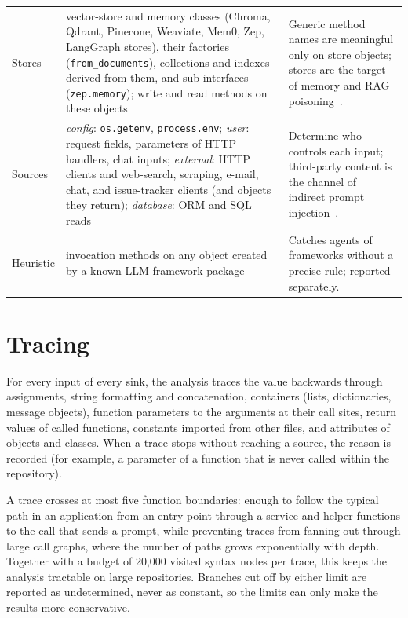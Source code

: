 \begin{table}[t]
\begin{tabular}{@{}>{\raggedright\arraybackslash}p{}>{\raggedright\arraybackslash}p{}>{\raggedright\arraybackslash}p{}@{}}
Stores & vector-store and memory classes (Chroma, Qdrant, Pinecone, Weaviate, Mem0, Zep, LangGraph stores), their factories (\texttt{from\_documents}), collections and indexes derived from them, and sub-interfaces (\texttt{zep.memory}); write and read methods on these objects & Generic method names are meaningful only on store objects; stores are the target of memory and RAG poisoning~\cite{poisonedrag,agentpoison}. \\
Sources & \emph{config}: \texttt{os.getenv}, \texttt{process.env}; \emph{user}: request fields, parameters of HTTP handlers, chat inputs; \emph{external}: HTTP clients and web-search, scraping, e-mail, chat, and issue-tracker clients (and objects they return); \emph{database}: ORM and SQL reads & Determine who controls each input; third-party content is the channel of indirect prompt injection~\cite{greshake}. \\
Heuristic & invocation methods on any object created by a known LLM framework package & Catches agents of frameworks without a precise rule; reported separately. \\
\bottomrule
\end{tabular}
\end{table}

\section{Tracing}
\label{sec:df-analysis}

For every input of every sink, the analysis traces the value backwards through assignments, string formatting and concatenation, containers (lists, dictionaries, message objects), function parameters to the arguments at their call sites, return values of called functions, constants imported from other files, and attributes of objects and classes. When a trace stops without reaching a source, the reason is recorded (for example, a parameter of a function that is never called within the repository).

A trace crosses at most five function boundaries: enough to follow the typical path in an application from an entry point through a service and helper functions to the call that sends a prompt, while preventing traces from fanning out through large call graphs, where the number of paths grows exponentially with depth. Together with a budget of 20{,}000 visited syntax nodes per trace, this keeps the analysis tractable on large repositories. Branches cut off by either limit are reported as undetermined, never as constant, so the limits can only make the results more conservative.

